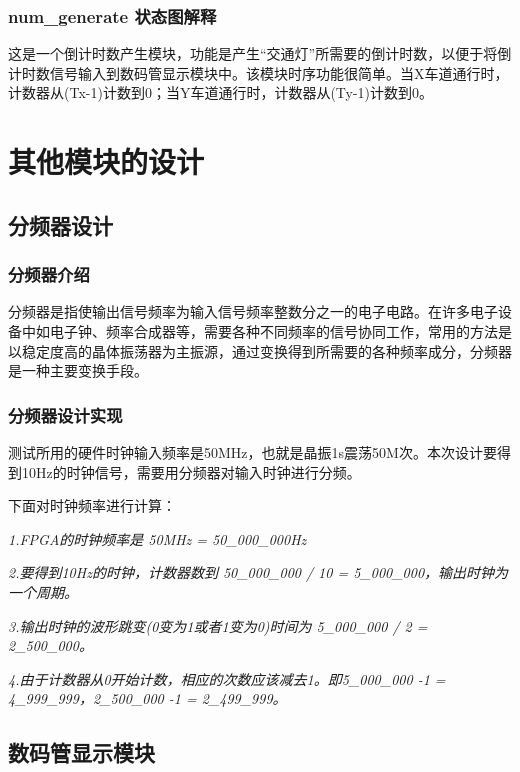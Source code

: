 \documentclass[12pt,a4paper]{article}
\begin{document}
	\subsubsection{num\_generate 状态图解释}
	这是一个倒计时数产生模块，功能是产生“交通灯”所需要的倒计时数，以便于将倒计时数信号输入到数码管显示模块中。该模块时序功能很简单。当X车道通行时，计数器从(Tx-1)计数到0；当Y车道通行时，计数器从(Ty-1)计数到0。
	
	\section{其他模块的设计}
	\subsection{分频器设计}
	\subsubsection{分频器介绍}
	分频器是指使输出信号频率为输入信号频率整数分之一的电子电路。在许多电子设备中如电子钟、频率合成器等，需要各种不同频率的信号协同工作，常用的方法是以稳定度高的晶体振荡器为主振源，通过变换得到所需要的各种频率成分，分频器是一种主要变换手段。
	\subsubsection{分频器设计实现}
	测试所用的硬件时钟输入频率是50MHz，也就是晶振1s震荡50M次。本次设计要得到10Hz的时钟信号，需要用分频器对输入时钟进行分频。
	
	下面对时钟频率进行计算：
	
{\small 	
	\textit{1.FPGA的时钟频率是 50MHz = 50\_000\_000Hz}
	
	\textit{2.要得到10Hz的时钟，计数器数到 50\_000\_000 / 10 = 5\_000\_000，输出时钟为一个周期。}
	
	\textit{3.输出时钟的波形跳变(0变为1或者1变为0)时间为 5\_000\_000 / 2 = 2\_500\_000。}
	
	\textit{4.由于计数器从0开始计数，相应的次数应该减去1。即5\_000\_000 -1 = 4\_999\_999，2\_500\_000 -1 = 2\_499\_999。}}
	\subsection{数码管显示模块}
\end{document}
